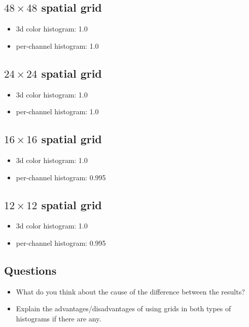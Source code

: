 \documentclass[12pt]{article}
\begin{document}
\subsection{$48\times48$ spatial grid}
\begin{itemize}
\item 3d color histogram: 1.0
\item per-channel histogram: 1.0
\end{itemize}

\subsection{$24\times24$ spatial grid}
\begin{itemize}
\item 3d color histogram: 1.0
\item per-channel histogram: 1.0
\end{itemize}

\subsection{$16\times16$ spatial grid}
\begin{itemize}
\item 3d color histogram: 1.0
\item per-channel histogram: 0.995
\end{itemize}

\subsection{$12\times12$ spatial grid}
\begin{itemize}
\item 3d color histogram: 1.0
\item per-channel histogram: 0.995
\end{itemize}

\subsection{Questions}
\begin{itemize}
\item What do you think about the cause of the difference between the results?
\item Explain the advantages/disadvantages of using grids in both types of histograms if there are any.
\end{itemize}
\end{document}
